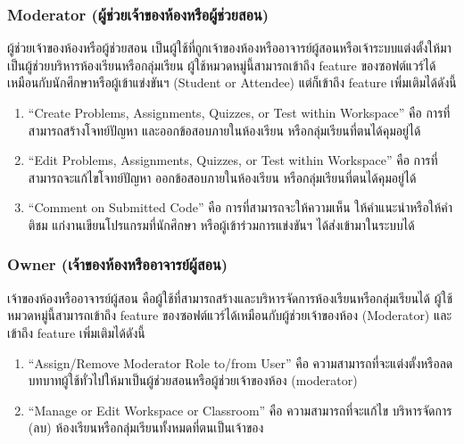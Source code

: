 \documentclass[12pt,one side,openright,a4paper]{cpe-thesis-th}
\newcommand{\thaijustify}[1]{%
  \par\hspace{30pt}\justifying
  #1
}
\begin{document}
        \subsubsection{Moderator (ผู้ช่วยเจ้าของห้องหรือผู้ช่วยสอน)}
            \thaijustify{
                ผู้ช่วยเจ้าของห้องหรือผู้ช่วยสอน เป็นผู้ใช้ที่ถูกเจ้าของห้องหรืออาจารย์ผู้สอนหรือเจ้าระบบแต่งตั้งให้มาเป็นผู้ช่วยบริหารห้องเรียนหรือกลุ่มเรียน ผู้ใช้หมวดหมู่นี้สามารถเข้าถึง feature ของซอฟต์แวร์ได้เหมือนกับนักศึกษาหรือผู้เข้าแข่งขันฯ (Student or Attendee) แต่ก็เข้าถึง feature เพิ่มเติมได้ดังนี้
            }
            \begin{enumerate}
                \item “Create Problems, Assignments, Quizzes, or Test within Workspace” คือ การที่สามารถสร้างโจทย์ปัญหา และออกข้อสอบภายในห้องเรียน หรือกลุ่มเรียนที่ตนได้คุมอยู่ได้
                \item “Edit Problems, Assignments, Quizzes, or Test within Workspace” คือ การที่สามารถจะแก้ไขโจทย์ปัญหา ออกข้อสอบภายในห้องเรียน หรือกลุ่มเรียนที่ตนได้คุมอยู่ได้
                \item “Comment on Submitted Code” คือ การที่สามารถจะให้ความเห็น ให้คำแนะนำหรือให้คำติชม แก่งานเขียนโปรแกรมที่นักศึกษา หรือผู้เข้าร่วมการแข่งขันฯ ได้ส่งเข้ามาในระบบได้
            \end{enumerate}
        \subsubsection{Owner (เจ้าของห้องหรืออาจารย์ผู้สอน)}
            \thaijustify{
                เจ้าของห้องหรืออาจารย์ผู้สอน คือผู้ใช้ที่สามารถสร้างและบริหารจัดการห้องเรียนหรือกลุ่มเรียนได้ ผู้ใช้หมวดหมู่นี้สามารถเข้าถึง feature ของซอฟต์แวร์ได้เหมือนกับผู้ช่วยเจ้าของห้อง (Moderator) และเข้าถึง feature เพิ่มเติมได้ดังนี้
            }
            \begin{enumerate}
                \item “Assign/Remove Moderator Role to/from User” คือ ความสามารถที่จะแต่งตั้งหรือลดบทบาทผู้ใช้ทั่วไปให้มาเป็นผู้ช่วยสอนหรือผู้ช่วยเจ้าของห้อง (moderator)
                \item “Manage or Edit Workspace or Classroom” คือ ความสามารถที่จะแก้ไข บริหารจัดการ (ลบ) ห้องเรียนหรือกลุ่มเรียนทั้งหมดที่ตนเป็นเจ้าของ
            \end{enumerate}
\end{document}
